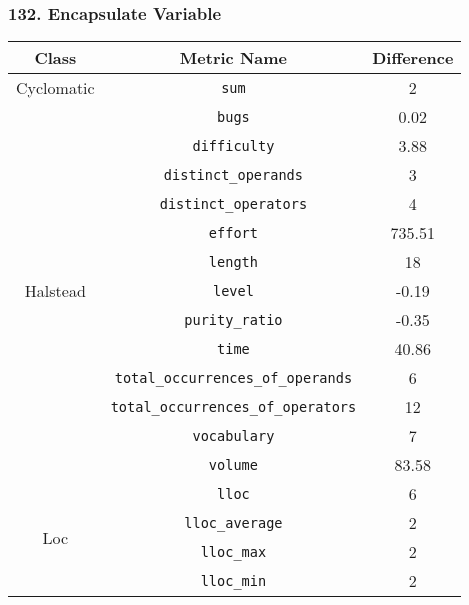 \subsubsection{ 132. Encapsulate Variable }

\begin{center}
  \begin{tabular}{ |c|c|c| }
    \hline

    Class & Metric Name                           & Difference \\

    \hline

    \multirow{ 1 }{6em}{ Cyclomatic }
          & \verb|sum|                            & 2          \\
    \hline
    \multirow{ 13 }{6em}{ Halstead }
          & \verb|bugs|                           & 0.02       \\
          & \verb|difficulty|                     & 3.88       \\
          & \verb|distinct_operands|              & 3          \\
          & \verb|distinct_operators|             & 4          \\
          & \verb|effort|                         & 735.51     \\
          & \verb|length|                         & 18         \\
          & \verb|level|                          & -0.19      \\
          & \verb|purity_ratio|                   & -0.35      \\
          & \verb|time|                           & 40.86      \\
          & \verb|total_occurrences_of_operands|  & 6          \\
          & \verb|total_occurrences_of_operators| & 12         \\
          & \verb|vocabulary|                     & 7          \\
          & \verb|volume|                         & 83.58      \\
    \hline
    \multirow{ 6 }{6em}{ Loc }
          & \verb|lloc|                           & 6          \\
          & \verb|lloc_average|                   & 2          \\
          & \verb|lloc_max|                       & 2          \\
          & \verb|lloc_min|                       & 2          \\

\end{tabular}
\end{center}

